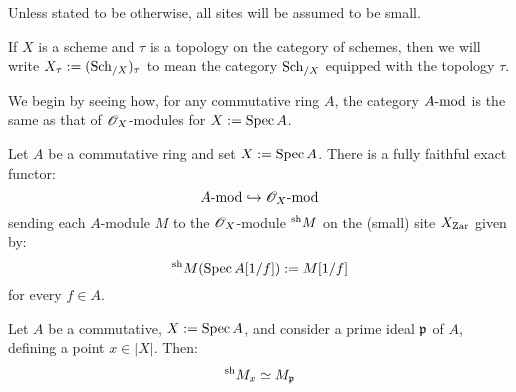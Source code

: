             \begin{convention}
                Unless stated to be otherwise, all sites will be assumed to be small. 

                If $X$ is a scheme and $\tau$ is a topology on the category of schemes, then we will write $X_{\tau} := (\Sch_{/X})_{\tau}$ to mean the category $\Sch_{/X}$ equipped with the topology $\tau$. 

                
            \end{convention}

            We begin by seeing how, for any commutative ring $A$, the category $A\mod$ is the same as that of $\scrO_X$-modules for $X := \Spec A$. 
            \begin{lemma} \label{lemma: sheafifying_modules}
                Let $A$ be a commutative ring and set $X := \Spec A$. There is a fully faithful exact functor:
                    $$A\mod \hookrightarrow \scrO_X\mod$$
                sending each $A$-module $M$ to the $\scrO_X$-module ${}^{\sh}M$ on the (small) site $X_{\Zar}$ given by:
                    $${}^{\sh}M(\Spec A[1/f]) := M[1/f]$$
                for every $f \in A$. 
            \end{lemma}
            \begin{corollary}
                Let $A$ be a commutative, $X := \Spec A$, and consider a prime ideal $\p$ of $A$, defining a point $x \in |X|$. Then:
                    $${}^{\sh}M_x \cong M_{\p}$$
            \end{corollary}
            
